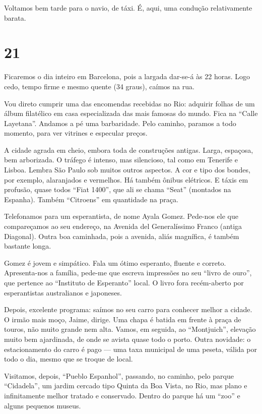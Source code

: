 Voltamos bem tarde para o navio, de táxi. É, aqui, uma condução relativamente barata.

\section*{21 \adfflatleafright {}}

Ficaremos o dia inteiro em Barcelona, pois a largada dar-se-á às 22 horas. Logo cedo, tempo firme e mesmo quente (34 graus), caímos na rua.

Vou direto cumprir uma das encomendas recebidas no Rio: adquirir folhas de um álbum filatélico em casa especializada das mais famosas do mundo. Fica na ``Calle Layetana''. Andamos a pé uma barbaridade. Pelo caminho, paramos a todo momento, para ver vitrines e especular preços.

A cidade agrada em cheio, embora toda de construções antigas. Larga, espaçosa, bem arborizada. O tráfego é intenso, mas silencioso, tal como em Tenerife e Lisboa. Lembra São Paulo sob muitos outros aspectos. A cor e tipo dos bondes, por exemplo, alaranjados e vermelhos. Há também ônibus elétricos. E táxis em profusão, quase todos ``Fiat 1400'', que ali se chama ``Seat'' (montados na Espanha). Também ``Citroens'' em quantidade na praça.

Telefonamos para um esperantista, de nome Ayala Gomez. Pede-nos ele que compareçamos ao seu endereço, na Avenida del Generalíssimo Franco (antiga Diagonal). Outra boa caminhada, pois a avenida, aliás magnífica, é também bastante longa.

Gomez é jovem e simpático. Fala um ótimo esperanto, fluente e correto. Apresenta-nos a família, pede-me que escreva impressões no seu ``livro de ouro'', que pertence ao ``Instituto de Esperanto'' local. O livro fora recém-aberto por esperantistas australianos e japoneses.

Depois, excelente programa: saímos no seu carro para conhecer melhor a cidade. O irmão mais moço, Jaime, dirige. Uma chapa é batida em frente à praça de touros, não muito grande nem alta. Vamos, em seguida, ao ``Montjuich'', elevação muito bem ajardinada, de onde se avista quase todo o porto. Outra novidade: o estacionamento do carro é pago --- uma taxa municipal de uma peseta, válida por todo o dia, mesmo que se troque de local.

Visitamos, depois, ``Pueblo Espanhol'', passando, no caminho, pelo parque ``Cidadela'', um jardim cercado tipo Quinta da Boa Vista, no Rio, mas plano e infinitamente melhor tratado e conservado. Dentro do parque há um ``zoo'' e alguns pequenos museus.


